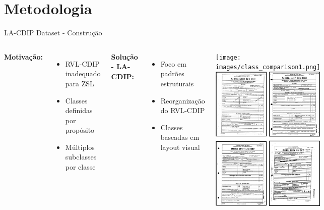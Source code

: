 \section{Metodologia}

\begin{frame}{LA-CDIP Dataset - Construção}
\begin{columns}
\textbf{Motivação:}
\begin{itemize}
    \item RVL-CDIP inadequado para ZSL
    \item Classes definidas por propósito
    \item Múltiplos subclasses por classe
\end{itemize}

\textbf{Solução - LA-CDIP:}
\begin{itemize}
    \item Foco em padrões estruturais
    \item Reorganização do RVL-CDIP
    \item Classes baseadas em layout visual
\end{itemize}

\texttt{[image: images/class\_comparison1.png]}
\vspace{0.2cm}
\includegraphics[width=\textwidth]{images/class_comparison2.png}
\end{columns}
\end{frame}

